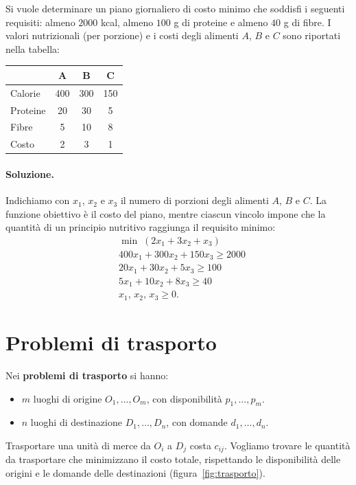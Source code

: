 \begin{esercizio}
Si vuole determinare un piano giornaliero di costo minimo che soddisfi i seguenti requisiti: almeno $2000$ kcal, almeno $100$ g di proteine e almeno $40$ g di fibre. I valori nutrizionali (per porzione) e i costi degli alimenti $A$, $B$ e $C$ sono riportati nella tabella:
\begin{center}
\begin{tabular}{lccc}
\toprule
 & A & B & C \\
\midrule
Calorie   & 400 & 300 & 150 \\
Proteine  & 20 & 30 & 5 \\
Fibre     & 5 & 10 & 8 \\
Costo     & 2 & 3 & 1 \\
\bottomrule
\end{tabular}
\end{center}
\end{esercizio}

\paragraph{Soluzione.}
Indichiamo con $x_1$, $x_2$ e $x_3$ il numero di porzioni degli alimenti $A$, $B$ e $C$. La funzione obiettivo è il costo del piano, mentre ciascun vincolo impone che la quantità di un principio nutritivo raggiunga il requisito minimo:
\[
\begin{aligned}
&\min \; (2x_1 + 3x_2 + x_3) \\
&400x_1 + 300x_2 + 150x_3 \ge 2000 \\
&20x_1 + 30x_2 + 5x_3 \ge 100 \\
&5x_1 + 10x_2 + 8x_3 \ge 40 \\
&x_1,\, x_2,\, x_3 \ge 0.
\end{aligned}
\]

\section{Problemi di trasporto}\label{sec:es-trasporto}
Nei \textbf{problemi di trasporto} si hanno:
\begin{itemize}
    \item $m$ luoghi di origine $O_1, \dots, O_m$, con disponibilità $p_1, \dots, p_m$.
    \item $n$ luoghi di destinazione $D_1, \dots, D_n$, con domande $d_1, \dots, d_n$.
\end{itemize}
Trasportare una unità di merce da $O_i$ a $D_j$ costa $c_{ij}$. Vogliamo trovare le quantità da trasportare che minimizzano il costo totale, rispettando le disponibilità delle origini e le domande delle destinazioni (figura~\ref{fig:trasporto}).

